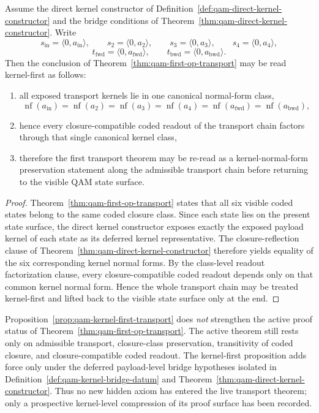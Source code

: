 \begin{proposition}\label{prop:qam-kernel-first-transport}
Assume the direct kernel constructor of Definition~\ref{def:qam-direct-kernel-constructor} and the bridge conditions of Theorem~\ref{thm:qam-direct-kernel-constructor}. Write
\[
s_{\mathrm{in}}=\langle 0,a_{\mathrm{in}}\rangle,
\qquad
s_2=\langle 0,a_2\rangle,
\qquad
s_3=\langle 0,a_3\rangle,
\qquad
s_4=\langle 0,a_4\rangle,
\]
\[
t_{\mathrm{fwd}}=\langle 0,a_{\mathrm{fwd}}\rangle,
\qquad
t_{\mathrm{bwd}}=\langle 0,a_{\mathrm{bwd}}\rangle.
\]
Then the conclusion of Theorem~\ref{thm:qam-first-op-transport} may be read kernel-first as follows:
\begin{enumerate}
\item all exposed transport kernels lie in one canonical normal-form class,
\[
\operatorname{nf}(a_{\mathrm{in}})=\operatorname{nf}(a_2)=\operatorname{nf}(a_3)=\operatorname{nf}(a_4)=\operatorname{nf}(a_{\mathrm{fwd}})=\operatorname{nf}(a_{\mathrm{bwd}}),
\]
\item hence every closure-compatible coded readout of the transport chain factors through that single canonical kernel class,
\item therefore the first transport theorem may be re-read as a kernel-normal-form preservation statement along the admissible transport chain before returning to the visible QAM state surface.
\end{enumerate}
\end{proposition}

\begin{proof}
Theorem~\ref{thm:qam-first-op-transport} states that all six visible coded states belong to the same coded closure class. Since each state lies on the present state surface, the direct kernel constructor exposes exactly the exposed payload kernel of each state as its deferred kernel representative. The closure-reflection clause of Theorem~\ref{thm:qam-direct-kernel-constructor} therefore yields equality of the six corresponding kernel normal forms. By the class-level readout factorization clause, every closure-compatible coded readout depends only on that common kernel normal form. Hence the whole transport chain may be treated kernel-first and lifted back to the visible state surface only at the end.
\end{proof}

\begin{remark}\label{rem:qam-kernel-first-transport-audit}
Proposition~\ref{prop:qam-kernel-first-transport} does \emph{not} strengthen the active proof status of Theorem~\ref{thm:qam-first-op-transport}. The active theorem still rests only on admissible transport, closure-class preservation, transitivity of coded closure, and closure-compatible coded readout. The kernel-first proposition adds force only under the deferred payload-level bridge hypotheses isolated in Definition~\ref{def:qam-kernel-bridge-datum} and Theorem~\ref{thm:qam-direct-kernel-constructor}. Thus no new hidden axiom has entered the live transport theorem; only a prospective kernel-level compression of its proof surface has been recorded.
\end{remark}


